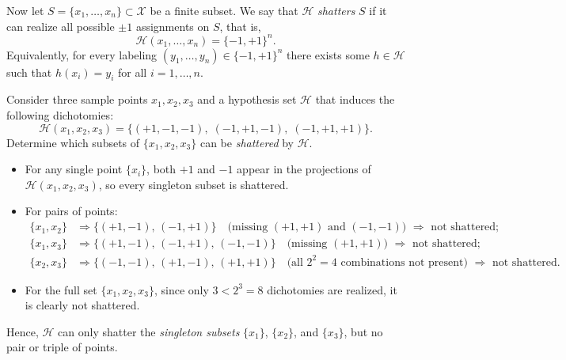 \documentclass[../main]{subfiles}
\begin{document}
Now let $S = \{x_1,\dots,x_n\} \subset \mathcal{X}$ be a finite subset.
We say that $\mathcal{H}$ \emph{shatters} $S$ if it can realize all possible
$\pm1$ assignments on $S$, that is,
\begin{equation}
    \mathcal{H}(x_1,\dots,x_n) = \{-1,+1\}^n.
\end{equation}
Equivalently, for every labeling $(y_1,\dots,y_n) \in \{-1,+1\}^n$
there exists some $h \in \mathcal{H}$ such that $h(x_i) = y_i$ for all $i=1,\dots,n$.
\begin{example}
    Consider three sample points $x_1, x_2, x_3$ and a hypothesis set $\mathcal{H}$
    that induces the following dichotomies:
    \begin{equation}
        \mathcal{H}(x_1,x_2,x_3)
        = \{ (+1,-1,-1),\; (-1,+1,-1),\; (-1,+1,+1) \}.
    \end{equation}
Determine which subsets of $\{x_1, x_2, x_3\}$ can be \emph{shattered} by $\mathcal{H}$.
\end{example}
\begin{solution}
    \begin{itemize}
        \item For any single point $\{x_i\}$, both $+1$ and $-1$ appear in the projections
        of $\mathcal{H}(x_1,x_2,x_3)$, so every singleton subset is shattered.
    
        \item For pairs of points:
        \begin{align*}
            \{x_1, x_2\} &\Rightarrow \{(+1,-1),\, (-1,+1)\} \quad
            \text{(missing $(+1,+1)$ and $(-1,-1)$) $\Rightarrow$ not shattered;} \\
            \{x_1, x_3\} &\Rightarrow \{(+1,-1),\, (-1,+1),\, (-1,-1)\} \quad
            \text{(missing $(+1,+1)$) $\Rightarrow$ not shattered;} \\
            \{x_2, x_3\} &\Rightarrow \{(-1,-1),\, (+1,-1),\, (+1,+1)\} \quad
            \text{(all $2^2=4$ combinations not present) $\Rightarrow$ not shattered.}
        \end{align*}
    
        \item For the full set $\{x_1,x_2,x_3\}$, since only $3<2^3=8$ dichotomies are realized,
        it is clearly not shattered.
    \end{itemize}
    
    Hence, $\mathcal{H}$ can only shatter the \emph{singleton subsets}
    $\{x_1\}$, $\{x_2\}$, and $\{x_3\}$, but no pair or triple of points.
\end{solution}
\end{document}
